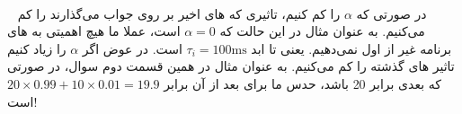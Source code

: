 \\~
در صورتی که
$\alpha$
را کم کنیم، تاثیری که
های
اخیر بر روی جواب می‌گذارند را کم می‌کنیم. به عنوان مثال در این حالت که
$\alpha = 0$
است، عملا ما هیچ اهمیتی به
های
برنامه غیر از
اول نمی‌دهیم. یعنی تا ابد
$\tau_{i} = 100 \text{ms}$
است.
در عوض اگر 
$\alpha$
را زیاد کنیم تاثیر
های
گذشته را کم می‌کنیم. به عنوان مثال در همین قسمت دوم سوال،
در صورتی که
بعدی برابر 20 باشد، حدس ما برای
بعد از آن برابر
$20 \times 0.99 + 10 \times 0.01 = 19.9$
است!




